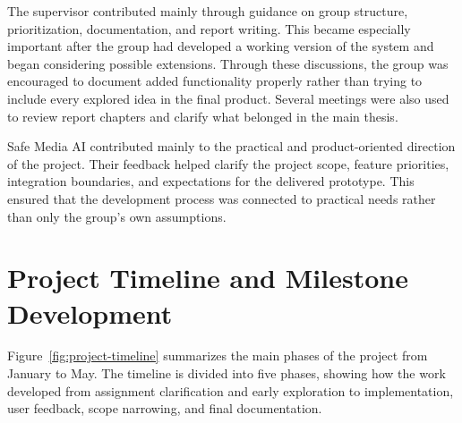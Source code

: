 \endgroup

The supervisor contributed mainly through guidance on group structure, prioritization, documentation, and report writing. This became especially important after the group had developed a working version of the system and began considering possible extensions. Through these discussions, the group was encouraged to document added functionality properly rather than trying to include every explored idea in the final product. Several meetings were also used to review report chapters and clarify what belonged in the main thesis.

Safe Media AI contributed mainly to the practical and product-oriented direction of the project. Their feedback helped clarify the project scope, feature priorities, integration boundaries, and expectations for the delivered prototype. This ensured that the development process was connected to practical needs rather than only the group’s own assumptions. 


\section{Project Timeline and Milestone Development}
\label{sec:project-timeline-milestones}

Figure~\ref{fig:project-timeline} summarizes the main phases of the project from January to May. The timeline is divided into five phases, showing how the work developed from assignment clarification and early exploration to implementation, user feedback, scope narrowing, and final documentation.

